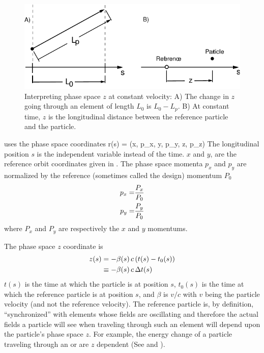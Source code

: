 \begin{figure}
\centering 
\includegraphics{canonical-z.pdf} 
\caption[Interpreting phase space $z$ at constant velocity.]
{Interpreting phase space $z$ at constant velocity: A) The change in $z$
going through an element of length $L_0$ is $L_0 - L_p$.  B) At
constant time, $z$ is the longitudinal distance between the reference
particle and the particle.}
\label{f:canonical.z}
\end{figure}

\bmad uses the phase space coordinates 
\Begineq
  \Bf r(s) = (x, p_x, y, p_y, z, p_z)
\Endeq
The longitudinal position $s$ is the independent variable instead of
the time. $x$ and $y$, are the reference orbit coordinates given in
.  The phase space momenta $p_x$ and $p_y$ are
normalized by the reference (sometimes called the
design) momentum $P_0$
\begin{align}
  p_x = &\frac{P_x}{P_0} \nonumber \\
  p_y = &\frac{P_y}{P_0}
  \label{ppp}
\end{align}
where $P_x$ and $P_y$ are respectively the $x$ and $y$ momentums.

The phase space $z$ coordinate is 
\begin{align}
  z(s) &= -\beta(s) \, c \, (t(s) - t_0(s)) \nonumber \\
    &\equiv - \beta(s) \, c \, \Delta t(s)
  \label{zbctt}
\end{align}
$t(s)$ is the time at which the particle is at position $s$, $t_0(s)$
is the time at which the reference particle is at position $s$, and
$\beta$ is $v/c$ with $v$ being the particle velocity (and not the
reference velocity). The reference particle is, by definition,
``synchronized'' with elements whose fields are oscillating and therefore the
actual fields a particle will see when traveling through such an
element will depend upon the particle's phase space $z$. For example,
the energy change of a particle traveling through an  or
 are $z$ dependent (See  and ).

